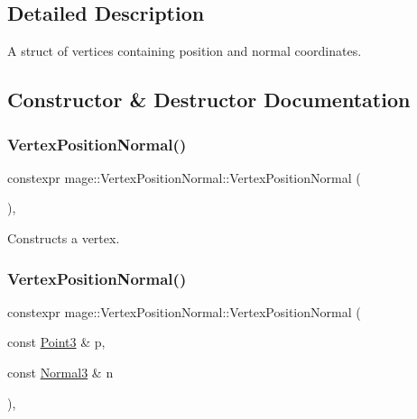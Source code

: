 \subsection{Detailed Description}
A struct of vertices containing position and normal coordinates. 

\subsection{Constructor \& Destructor Documentation}
\hypertarget{structmage_1_1_vertex_position_normal_ab4a9d63bf68a8c3b867117eec117421e}{}\label{structmage_1_1_vertex_position_normal_ab4a9d63bf68a8c3b867117eec117421e} 
\subsubsection{\texorpdfstring{Vertex\+Position\+Normal()}{VertexPositionNormal()}\hspace{0.1cm}{\footnotesize\ttfamily [1/4]}}
{\footnotesize\ttfamily constexpr mage\+::\+Vertex\+Position\+Normal\+::\+Vertex\+Position\+Normal (\begin{DoxyParamCaption}{ }\end{DoxyParamCaption})\hspace{0.3cm}{\ttfamily [default]}, {\ttfamily [noexcept]}}

Constructs a vertex. \hypertarget{structmage_1_1_vertex_position_normal_abfd18eec0148243507ba4d36b4298ea1}{}\label{structmage_1_1_vertex_position_normal_abfd18eec0148243507ba4d36b4298ea1} 
\subsubsection{\texorpdfstring{Vertex\+Position\+Normal()}{VertexPositionNormal()}\hspace{0.1cm}{\footnotesize\ttfamily [2/4]}}
{\footnotesize\ttfamily constexpr mage\+::\+Vertex\+Position\+Normal\+::\+Vertex\+Position\+Normal (\begin{DoxyParamCaption}\item[{const \hyperlink{structmage_1_1_point3}{Point3} \&}]{p,  }\item[{const \hyperlink{structmage_1_1_normal3}{Normal3} \&}]{n }\end{DoxyParamCaption})\hspace{0.3cm}{\ttfamily [explicit]}, {\ttfamily [noexcept]}}

